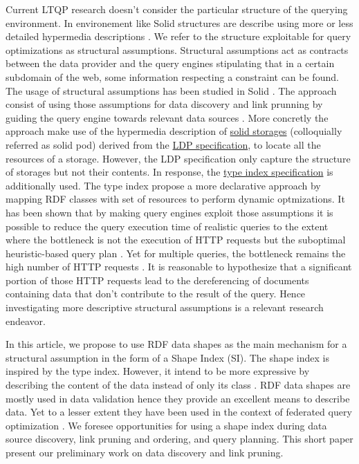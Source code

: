 Current LTQP research doesn't consider the particular structure of the querying environment.
In environement like Solid structures are describe using more or less detailed hypermedia descriptions \cite{Fielding}.
We refer to the structure exploitable for query optimizations as structural assumptions.
Structural assumptions act as contracts between the data provider and 
the query engines stipulating that in a certain subdomain of the web, some information respecting a constraint can be found.
The usage of structural assumptions has been studied in Solid \cite{Taelman2023}.
The approach consist of using those assumptions for data discovery and link prunning by guiding the
query engine towards relevant data sources \cite{verborgh2020guided}.
More concretly the approach make use of the hypermedia description of 
\href{https://solidproject.org/TR/protocol#resources}{solid storages} (colloquially referred as solid pod)
derived from the \href{https://www.w3.org/TR/ldp/}{LDP specification},
to locate all the resources of a storage.
However, the LDP specification only capture the structure of storages but not their contents.
In response, the \href{https://solid.github.io/type-indexes/}{type index specification} is additionally used.
The type index propose a more declarative approach \cite{Taelman2017} by mapping RDF classes with set of resources to perform dynamic optmizations.
It has been shown that by making query engines exploit those assumptions it is possible to reduce the query execution time
of realistic queries to the extent where the bottleneck is not the execution of 
HTTP requests but the suboptimal heuristic-based query plan \cite{eschauzier_quweda_2023, Taelman2023}.
Yet for multiple queries, the bottleneck remains the high number of HTTP requests  \cite{eschauzier_quweda_2023}.
It is reasonable to hypothesize that a significant portion of those HTTP requests lead to the dereferencing of
documents containing data that don't contribute to the result of the query.
Hence investigating more descriptive structural assumptions is a relevant research endeavor.

In this article, we propose to use RDF data shapes as the main mechanism for a structural assumption in the form of a Shape Index (SI).
The shape index is inspired by the type index.
However, it intend to be more expressive by describing the content of the data instead of only its class \cite{Taelman2017}.
RDF data shapes are mostly used in data validation \cite{Gayo2018a} hence they provide an excellent means to describe data.
Yet to a lesser extent they have been used in the context of federated query optimization \cite{kashif2021}.
We foresee opportunities for using a shape index during data source discovery, link pruning and ordering, and query planning.
This short paper present our preliminary work on data discovery and link pruning.